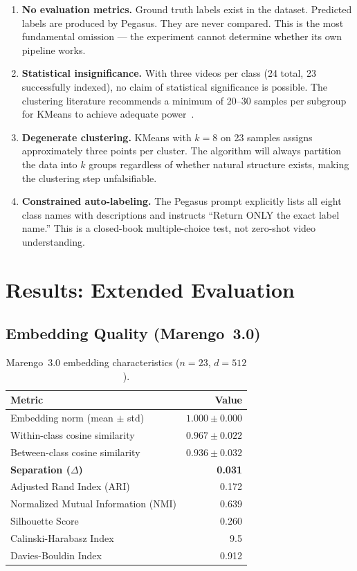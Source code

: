 \documentclass[11pt,a4paper]{article}
\begin{document}
\begin{enumerate}
    \item \textbf{No evaluation metrics.} Ground truth labels exist in the dataset. Predicted labels are produced by Pegasus. They are never compared. This is the most fundamental omission --- the experiment cannot determine whether its own pipeline works.

    \item \textbf{Statistical insignificance.} With three videos per class (24 total, 23 successfully indexed), no claim of statistical significance is possible. The clustering literature recommends a minimum of 20--30 samples per subgroup for KMeans to achieve adequate power~\cite{cluster_power}.

    \item \textbf{Degenerate clustering.} KMeans with $k{=}8$ on 23 samples assigns approximately three points per cluster. The algorithm will always partition the data into $k$ groups regardless of whether natural structure exists, making the clustering step unfalsifiable.

    \item \textbf{Constrained auto-labeling.} The Pegasus prompt explicitly lists all eight class names with descriptions and instructs ``Return ONLY the exact label name.'' This is a closed-book multiple-choice test, not zero-shot video understanding.
\end{enumerate}

\section{Results: Extended Evaluation}

\subsection{Embedding Quality (Marengo~3.0)}

\begin{table}[H]
\centering
\caption{Marengo~3.0 embedding characteristics ($n{=}23$, $d{=}512$).}
\label{tab:embedding_stats}
\begin{tabular}{@{}lr@{}}
\toprule
\textbf{Metric} & \textbf{Value} \\
\midrule
Embedding norm (mean $\pm$ std) & $1.000 \pm 0.000$ \\
Within-class cosine similarity & $0.967 \pm 0.022$ \\
Between-class cosine similarity & $0.936 \pm 0.032$ \\
\textbf{Separation ($\Delta$)} & \textbf{0.031} \\
\midrule
Adjusted Rand Index (ARI) & 0.172 \\
Normalized Mutual Information (NMI) & 0.639 \\
Silhouette Score & 0.260 \\
Calinski-Harabasz Index & 9.5 \\
Davies-Bouldin Index & 0.912 \\
\bottomrule
\end{tabular}
\end{table}
\end{document}
